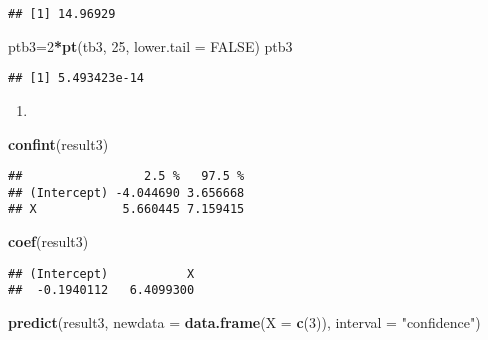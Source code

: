 \documentclass[
]{article}
\newenvironment{Shaded}{\begin{snugshade}}{\end{snugshade}}
\newcommand{\DataTypeTok}[1]{\textcolor[rgb]{0.13,0.29,0.53}{#1}}
\newcommand{\DecValTok}[1]{\textcolor[rgb]{0.00,0.00,0.81}{#1}}
\newcommand{\KeywordTok}[1]{\textcolor[rgb]{0.13,0.29,0.53}{\textbf{#1}}}
\newcommand{\NormalTok}[1]{#1}
\newcommand{\OperatorTok}[1]{\textcolor[rgb]{0.81,0.36,0.00}{\textbf{#1}}}
\newcommand{\OtherTok}[1]{\textcolor[rgb]{0.56,0.35,0.01}{#1}}
\newcommand{\StringTok}[1]{\textcolor[rgb]{0.31,0.60,0.02}{#1}}
\begin{document}
\begin{verbatim}
## [1] 14.96929
\end{verbatim}

\begin{Shaded}
\begin{Highlighting}[]
\NormalTok{ptb3=}\DecValTok{2}\OperatorTok{*}\KeywordTok{pt}\NormalTok{(tb3, }\DecValTok{25}\NormalTok{, }\DataTypeTok{lower.tail =} \OtherTok{FALSE}\NormalTok{)}
\NormalTok{ptb3}
\end{Highlighting}
\end{Shaded}

\begin{verbatim}
## [1] 5.493423e-14
\end{verbatim}

\begin{enumerate}
\def\labelenumi{(\alph{enumi})}
\setcounter{enumi}{5}
\item
\end{enumerate}

\begin{Shaded}
\begin{Highlighting}[]
\KeywordTok{confint}\NormalTok{(result3)}
\end{Highlighting}
\end{Shaded}

\begin{verbatim}
##                 2.5 %   97.5 %
## (Intercept) -4.044690 3.656668
## X            5.660445 7.159415
\end{verbatim}

\begin{Shaded}
\begin{Highlighting}[]
\KeywordTok{coef}\NormalTok{(result3)}
\end{Highlighting}
\end{Shaded}

\begin{verbatim}
## (Intercept)           X 
##  -0.1940112   6.4099300
\end{verbatim}

\begin{Shaded}
\begin{Highlighting}[]
\KeywordTok{predict}\NormalTok{(result3, }\DataTypeTok{newdata =} \KeywordTok{data.frame}\NormalTok{(}\DataTypeTok{X =} \KeywordTok{c}\NormalTok{(}\DecValTok{3}\NormalTok{)), }\DataTypeTok{interval =} \StringTok{"confidence"}\NormalTok{)}
\end{Highlighting}
\end{Shaded}
\end{document}
